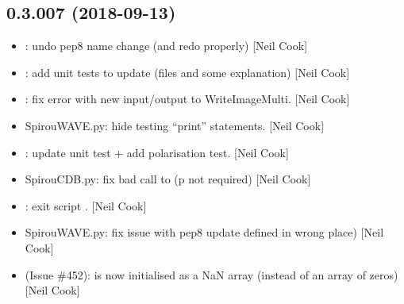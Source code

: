 \documentclass[a4paper,10pt,english]{report}
\begin{document}
\subsection{0.3.007 (2018-09-13)}
\label{\detokenize{misc/changelog:id326}}\begin{itemize}
\item {} 
: undo pep8 name change (and redo properly) {[}Neil
Cook{]}

\item {} 
: add unit tests to update (files and some
explanation) {[}Neil Cook{]}

\item {} 
: fix error with new input/output to WriteImageMulti.
{[}Neil Cook{]}

\item {} 
SpirouWAVE.py: hide testing “print” statements. {[}Neil Cook{]}

\item {} 
: update unit test + add polarisation test. {[}Neil Cook{]}

\item {} 
SpirouCDB.py: fix bad call to  (p not required) {[}Neil
Cook{]}

\item {} 
: exit script . {[}Neil Cook{]}

\item {} 
SpirouWAVE.py: fix issue with pep8 update  defined in wrong
place) {[}Neil Cook{]}

\item {} 
 (Issue \#452):  is now initialised as a NaN
array (instead of an array of zeros) {[}Neil Cook{]}

\end{itemize}
\end{document}
